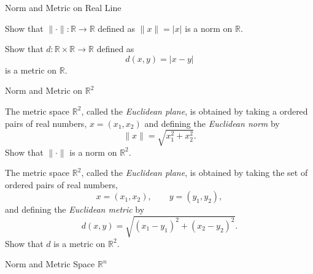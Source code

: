\documentclass[12pt, a4paper]{article}
\begin{document}
\clearpage

\begin{heading}
    Norm and Metric on Real Line
\end{heading}

\vspace{10pt}

\begin{theorem}
    Show that $\|\cdot\|:\mathbb{R}\to\mathbb{R}$ defined as $\|x\|=|x|$ is a norm on $\mathbb{R}$.
\end{theorem}

\vspace{200pt}

\begin{theorem}
    Show that $d:\mathbb{R}\times\mathbb{R}\to\mathbb{R}$ defined as
    \[
        d(x,y)=|x-y|
    \]
    is a metric on $\mathbb{R}$.
\end{theorem}


\clearpage

\begin{heading}
    Norm and Metric on $\mathbb{R}^2$
\end{heading}

\begin{theorem}
    The metric space $\mathbb{R}^2$, called the \emph{Euclidean plane}, is obtained by
    taking a ordered pairs of real numbers,
    \(
    x=(x_1,x_2)
    \)
    and defining the \emph{Euclidean norm} by
    \[
    \|x\|=\sqrt{x_1^2+x_2^2}.
    \]
    Show that $\|\cdot\|$ is a norm on $\mathbb{R}^2$.
\end{theorem}

\vspace{150pt}

\begin{theorem}
    The metric space $\mathbb{R}^2$, called the \emph{Euclidean plane}, is obtained by
    taking the set of ordered pairs of real numbers,
    \[
    x=(x_1,x_2), \qquad y=(y_1,y_2),
    \]
    and defining the \emph{Euclidean metric} by
    \[
    d(x,y)=\sqrt{(x_1-y_1)^2+(x_2-y_2)^2}.
    \]
    Show that $d$ is a metric on $\mathbb{R}^2$.
\end{theorem}

\clearpage

\begin{heading}
    Norm and Metric Space $\mathbb{R}^n$
\end{heading}
\end{document}

